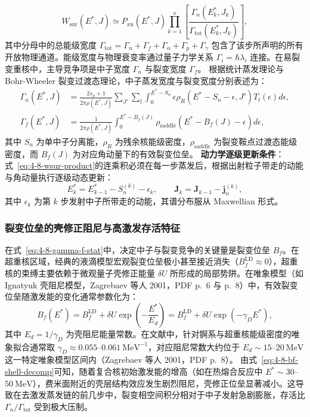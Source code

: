 \begin{enumerate}
\begin{equation}\label{eq:4-8-wsur-product}
W_{\mathrm{sur}}(E^*, J) \simeq P_{x\mathrm{n}}(E^*, J) \prod_{k=1}^x \left[ \frac{\Gamma_n(E_k^*, J_k)}{\Gamma_{\mathrm{tot}}(E_k^*, J_k)} \right],
\end{equation}
其中分母中的总能级宽度 $\Gamma_{\mathrm{tot}} = \Gamma_n + \Gamma_f + \Gamma_\alpha + \Gamma_p + \Gamma_\gamma$ 包含了该步所声明的所有开放物理通道。能级宽度与物理衰变率通过量子力学关系 $\Gamma_i = \hbar \lambda_i$ 连接。在易裂变重核中，主导竞争项是中子宽度 $\Gamma_n$ 与裂变宽度 $\Gamma_f$。
根据统计蒸发理论与 Bohr-Wheeler 裂变过渡态理论，中子蒸发宽度与裂变宽度分别表述为：
\begin{align}
\Gamma_n(E^*, J) &= \frac{2s_n + 1}{2\pi \rho(E^*, J)} \sum_{J'} \sum_{l} \int_0^{E^* - S_n} \epsilon \rho_R(E^* - S_n - \epsilon, J') T_l(\epsilon) d\epsilon, \label{eq:4-8-gamma-n-stat}\\
\Gamma_f(E^*, J) &= \frac{1}{2\pi \rho(E^*, J)} \int_0^{E^* - B_f(J)} \rho_{\mathrm{saddle}}(E^* - B_f(J) - \epsilon) d\epsilon, \label{eq:4-8-gamma-f-stat}
\end{align}
其中 $S_n$ 为单中子分离能，$\rho_R$ 为残余核能级密度，$\rho_{\mathrm{saddle}}$ 为裂变鞍点过渡态能级密度，而 $B_f(J)$ 为对应角动量下的有效裂变位垒。
\textbf{动力学逐级更新条件}：式~\eqref{eq:4-8-wsur-product}的连乘积必须在每一步蒸发后，根据出射粒子带走的动能与角动量执行逐级动态更新：
\begin{equation}\label{eq:4-8-stepwise-dyn-update}
E_k^* = E_{k-1}^* - S_n^{(k)} - \epsilon_k, \qquad \mathbf{J}_k = \mathbf{J}_{k-1} - \mathbf{j}_n^{(k)},
\end{equation}
其中 $\epsilon_k$ 为第 $k$ 步发射中子所带走的动能，其谱分布服从 Maxwellian 形式。
\end{enumerate}

\subsubsection{裂变位垒的壳修正阻尼与高激发存活特征}

在式~\eqref{eq:4-8-gamma-f-stat}中，决定中子与裂变竞争的关键量是裂变位垒 $B_f$。在超重核区域，经典的液滴模型宏观裂变位垒极小甚至接近消失（$B_f^{\mathrm{LD}} \approx 0$），超重核的束缚主要依赖于微观量子壳修正能量 $\delta U$ 所形成的局部势阱。在唯象模型（如 Ignatyuk 壳阻尼模型，Zagrebaev 等人 2001，PDF p.~6 与 p.~8）中，有效裂变位垒随激发能的变化通常参数化为：
\begin{equation}\label{eq:4-8-bf-shell-decomp}
B_f(E^*) = B_f^{\mathrm{LD}} + \delta U \exp\left(-\frac{E^*}{E_d}\right) = B_f^{\mathrm{LD}} + \delta U \exp(-\gamma_D E^*),
\end{equation}
其中 $E_d = 1/\gamma_D$ 为壳阻尼能量常数。在文献中，针对锕系与超重核能级密度的唯象拟合通常取 $\gamma_D \approx 0.055$--$0.061\ \mathrm{MeV}^{-1}$，对应阻尼常数大约位于 $E_d \sim 15$--$20\ \mathrm{MeV}$ 这一特定唯象模型区间内（Zagrebaev 等人 2001，PDF p.~8）。
由式~\eqref{eq:4-8-bf-shell-decomp}可知，随着复合核初始激发能的增高（如在热熔合反应中 $E^* \sim 30$--$50\ \mathrm{MeV}$），费米面附近的壳层结构效应发生剧烈阻尼，壳修正位垒显著减小。这导致在去激发蒸发链的前几步中，裂变相空间积分相对于中子发射急剧膨胀，存活比 $\Gamma_n / \Gamma_{\mathrm{tot}}$ 受到极大压制。


